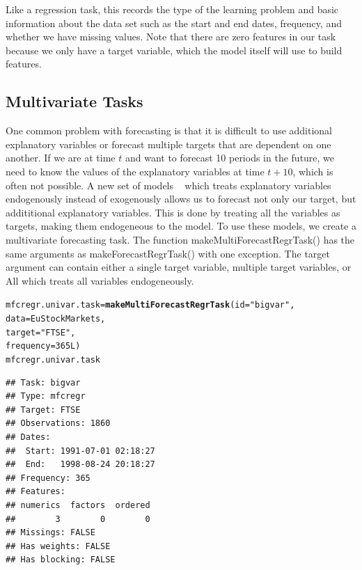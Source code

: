 \documentclass{article}\usepackage[]{graphicx}\usepackage[]{color}
\makeatletter
\newcommand{\hlnum}[1]{\textcolor[rgb]{0.686,0.059,0.569}{#1}}%
\newcommand{\hlstr}[1]{\textcolor[rgb]{0.192,0.494,0.8}{#1}}%
\newcommand{\hlstd}[1]{\textcolor[rgb]{0.345,0.345,0.345}{#1}}%
\newcommand{\hlkwb}[1]{\textcolor[rgb]{0.69,0.353,0.396}{#1}}%
\newcommand{\hlkwc}[1]{\textcolor[rgb]{0.333,0.667,0.333}{#1}}%
\newcommand{\hlkwd}[1]{\textcolor[rgb]{0.737,0.353,0.396}{\textbf{#1}}}%
\newenvironment{kframe}{%
 \def\at@end@of@kframe{}%
 \ifinner\ifhmode%
  \def\at@end@of@kframe{\end{minipage}}%
  \begin{minipage}{\columnwidth}%
 \fi\fi%
 \def\FrameCommand##1{\hskip\@totalleftmargin \hskip-\fboxsep
 \colorbox{shadecolor}{##1}\hskip-\fboxsep
     \hskip-\linewidth \hskip-\@totalleftmargin \hskip\columnwidth}%
 \MakeFramed {\advance\hsize-\width
   \@totalleftmargin\z@ \linewidth\hsize
   \@setminipage}}%
 {\par\unskip\endMakeFramed%
 \at@end@of@kframe}
\newenvironment{knitrout}{}{} %
\theoremstyle{definition}
\newcommand\code{\@codex}
\def\@codex#1{{\normalfont\ttfamily\hyphenchar\font=-1 #1}}
\makeatother
\begin{document}
Like a regression task, this records the type of the learning problem and basic information about the data set such as the start and end dates, frequency, and whether we have missing values. Note that there are zero features in our task because we only have a target variable, which the model itself will use to build features.

\subsection{Multivariate Tasks}

One common problem with forecasting is that it is difficult to use additional explanatory variables or forecast multiple targets that are dependent on one another. If we are at time $t$ and want to forecast 10 periods in the future, we need to know the values of the explanatory variables at time $t+10$, which is often not possible. A new set of models ~\cite{BigVAR} which treats explanatory variables endogenously instead of exogenously allows us to forecast not only our target, but addititional explanatory variables. This is done by treating all the variables as targets, making them endogeneous to the model. To use these models, we create a multivariate forecasting task. The function \code{makeMultiForecastRegrTask()} has the same arguments as \code{makeForecastRegrTask()} with one exception. The \code{target} argument can contain either a single target variable, multiple target variables, or \code{All} which treats all variables endogeneously.

\begin{knitrout}
\color{fgcolor}\begin{kframe}
\begin{alltt}
\hlstd{mfcregr.univar.task} \hlkwb{=} \hlkwd{makeMultiForecastRegrTask}\hlstd{(}\hlkwc{id} \hlstd{=} \hlstr{"bigvar"}\hlstd{,}
                                                \hlkwc{data} \hlstd{= EuStockMarkets,}
                                                \hlkwc{target} \hlstd{=} \hlstr{"FTSE"}\hlstd{,}
                                                \hlkwc{frequency} \hlstd{=} \hlnum{365L}\hlstd{)}
\hlstd{mfcregr.univar.task}
\end{alltt}
\begin{verbatim}
## Task: bigvar
## Type: mfcregr
## Target: FTSE
## Observations: 1860
## Dates:
##  Start: 1991-07-01 02:18:27 
##  End:   1998-08-24 20:18:27
## Frequency: 365
## Features:
## numerics  factors  ordered 
##        3        0        0 
## Missings: FALSE
## Has weights: FALSE
## Has blocking: FALSE
\end{verbatim}
\end{kframe}
\end{knitrout}
\end{document}
